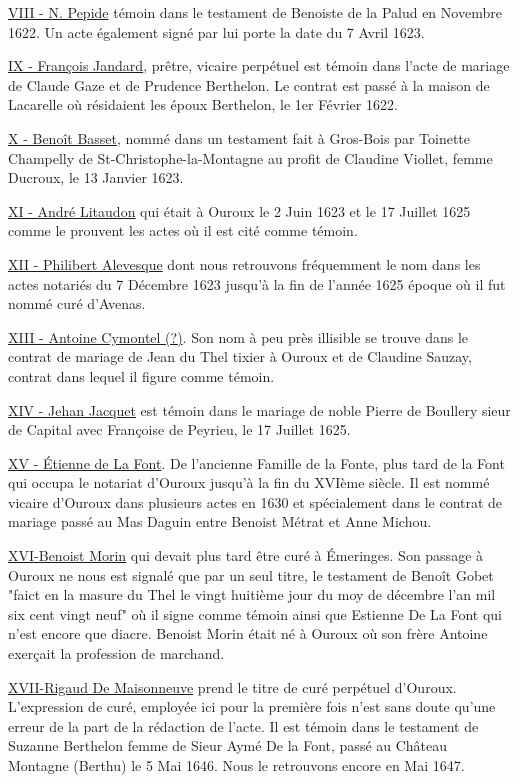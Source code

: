 \underline{VIII - N. Pepide} témoin dans le testament de Benoiste de la Palud en Novembre 1622. Un acte également signé par lui porte la date du 7 Avril 1623.

\underline{IX - François Jandard}, prêtre, vicaire perpétuel est témoin dans l'acte de mariage de Claude Gaze et de Prudence Berthelon. Le contrat est passé à la maison de Lacarelle où résidaient les époux Berthelon, le 1er Février 1622.

\underline{X - Benoît Basset}, nommé dans un testament fait à Gros-Bois par Toinette Champelly de St-Christophe-la-Montagne au profit de Claudine Viollet, femme Ducroux, le 13 Janvier 1623.

\underline{XI - André Litaudon} qui était à Ouroux le 2 Juin 1623 et le 17 Juillet 1625 comme le prouvent les actes où il est cité comme témoin.

\underline{XII - Philibert Alevesque} dont nous retrouvons fréquemment le nom dans les actes notariés du 7 Décembre 1623 jusqu'à la fin de l'année 1625 époque où il fut nommé curé d'Avenas.

\underline{XIII - Antoine Cymontel (?)}. Son nom à peu près illisible se trouve dans le contrat de mariage de Jean du Thel tixier à Ouroux et de Claudine Sauzay, contrat dans lequel il figure comme témoin.

\underline{XIV - Jehan Jacquet} est témoin dans le mariage de noble Pierre de Boullery sieur de Capital avec Françoise de Peyrieu, le 17 Juillet 1625.

\underline{XV - Étienne de La Font}. De l'ancienne Famille de la Fonte, plus tard de la Font qui occupa le notariat d'Ouroux jusqu'à la fin du XVIème siècle. Il est nommé vicaire d'Ouroux dans plusieurs actes en 1630 et spécialement dans le contrat de mariage passé au Mas Daguin entre Benoist Métrat et Anne Michou.

\underline{XVI-Benoist Morin} qui devait plus tard être curé à Émeringes. Son
passage à Ouroux ne nous est signalé que par un seul titre, le testament de Benoît Gobet "faict en la masure du Thel le vingt huitième jour du moy de décembre l'an mil six cent vingt neuf" où il
signe comme témoin ainsi que Estienne De La Font qui n'est encore
que diacre. Benoist Morin était né à Ouroux où son frère Antoine
exerçait la profession de marchand.

\underline{XVII-Rigaud De Maisonneuve} prend le titre de curé perpétuel d'Ouroux.
L'expression de curé, employée ici pour la première fois n'est
sans doute qu'une erreur de la part de la rédaction de l'acte. Il
est témoin dans le testament de Suzanne Berthelon femme de Sieur
Aymé De la Font, passé au Château Montagne (Berthu) le 5 Mai 1646.
Nous le retrouvons encore en Mai 1647.

